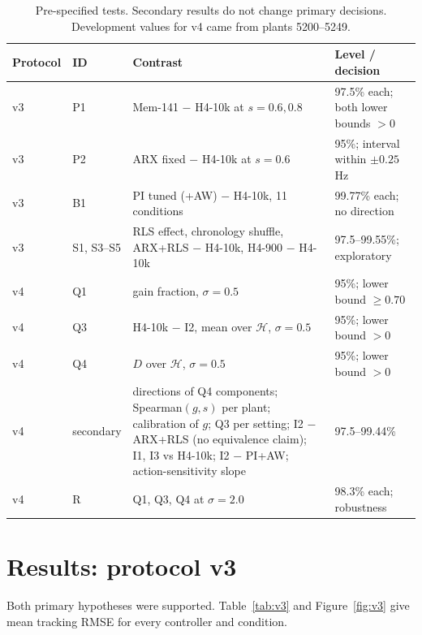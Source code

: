 \documentclass[11pt]{article}
\newcommand{\Hz}{\,Hz}
\begin{document}
\begin{table}[t]\centering\small
\caption{Pre-specified tests. Secondary results do not change primary decisions. Development values for v4 came from plants 5200--5249.}\label{tab:hyp}
\begin{tabular}{@{}llL{7.6cm}L{4.4cm}@{}}\toprule
Protocol & ID & Contrast & Level / decision\\\midrule
v3 & P1 & Mem-141 $-$ H4-10k at $s=0.6, 0.8$ & 97.5\% each; both lower bounds $>0$\\
v3 & P2 & ARX fixed $-$ H4-10k at $s=0.6$ & 95\%; interval within $\pm0.25$\Hz\\
v3 & B1 & PI tuned (+AW) $-$ H4-10k, 11 conditions & 99.77\% each; no direction\\
v3 & S1, S3--S5 & RLS effect, chronology shuffle, ARX+RLS $-$ H4-10k, H4-900 $-$ H4-10k & 97.5--99.55\%; exploratory\\
v4 & Q1 & gain fraction, $\sigma=0.5$ & 95\%; lower bound $\ge0.70$\\
v4 & Q3 & H4-10k $-$ I2, mean over $\mathcal H$, $\sigma=0.5$ & 95\%; lower bound $>0$\\
v4 & Q4 & $D$ over $\mathcal H$, $\sigma=0.5$ & 95\%; lower bound $>0$\\
v4 & secondary & directions of Q4 components; Spearman$(g,s)$ per plant; calibration of $g$; Q3 per setting; I2 $-$ ARX+RLS (no equivalence claim); I1, I3 vs H4-10k; I2 $-$ PI+AW; action-sensitivity slope & 97.5--99.44\%\\
v4 & R & Q1, Q3, Q4 at $\sigma=2.0$ & 98.3\% each; robustness\\\bottomrule
\end{tabular}\end{table}

\section{Results: protocol v3}
Both primary hypotheses were supported. Table~\ref{tab:v3} and Figure~\ref{fig:v3} give mean tracking RMSE for every controller and condition.
\end{document}
